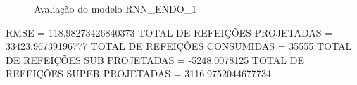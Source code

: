 \documentclass[	12pt, Times, openright, twoside, a4paper, english, brazil]{abntex2}
\begin{document}
                \begin{figure}[!ht]
                  \caption{Avaliação do modelo RNN\_ENDO\_1 \label{fig:case1_rnn_endo1_val} }
                \end{figure}
                RMSE = 118.98273426840373\newline
                TOTAL DE REFEIÇÕES PROJETADAS = 33423.96739196777\newline
                TOTAL DE REFEIÇÕES CONSUMIDAS = 35555\newline
                TOTAL DE REFEIÇÕES SUB PROJETADAS = -5248.0078125\newline
                TOTAL DE REFEIÇÕES SUPER PROJETADAS = 3116.9752044677734\newline

\end{document}
